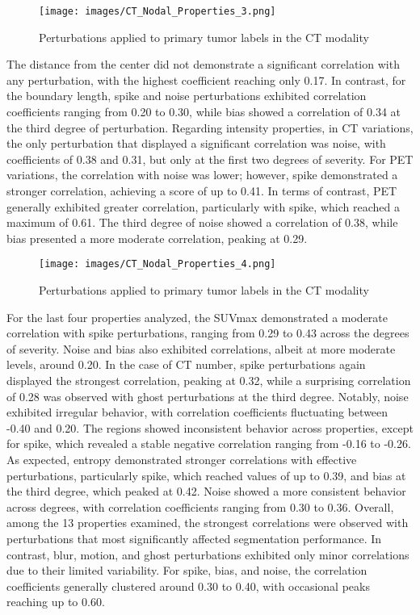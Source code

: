 \begin{figure}[ht]
    \centering
    \texttt{[image: images/CT\_Nodal\_Properties\_3.png]}
    \caption{Perturbations applied to primary tumor labels in the CT modality}
    \label{fig:three_subfigures}
\end{figure}
\newpage
The distance from the center did not demonstrate a significant correlation with any perturbation, with the highest coefficient reaching only 0.17. In contrast, for the boundary length, spike and noise perturbations exhibited correlation coefficients ranging from 0.20 to 0.30, while bias showed a correlation of 0.34 at the third degree of perturbation.
Regarding intensity properties, in CT variations, the only perturbation that displayed a significant correlation was noise, with coefficients of 0.38 and 0.31, but only at the first two degrees of severity. For PET variations, the correlation with noise was lower; however, spike demonstrated a stronger correlation, achieving a score of up to 0.41.
In terms of contrast, PET generally exhibited greater correlation, particularly with spike, which reached a maximum of 0.61. The third degree of noise showed a correlation of 0.38, while bias presented a more moderate correlation, peaking at 0.29.
\begin{figure}[ht]
    \centering
    \texttt{[image: images/CT\_Nodal\_Properties\_4.png]}
    \caption{Perturbations applied to primary tumor labels in the CT modality}
    \label{fig:three_subfigures}
\end{figure}

For the last four properties analyzed, the SUVmax demonstrated a moderate correlation with spike perturbations, ranging from 0.29 to 0.43 across the degrees of severity. Noise and bias also exhibited correlations, albeit at more moderate levels, around 0.20. In the case of CT number, spike perturbations again displayed the strongest correlation, peaking at 0.32, while a surprising correlation of 0.28 was observed with ghost perturbations at the third degree. Notably, noise exhibited irregular behavior, with correlation coefficients fluctuating between -0.40 and 0.20.
The regions showed inconsistent behavior across properties, except for spike, which revealed a stable negative correlation ranging from -0.16 to -0.26. As expected, entropy demonstrated stronger correlations with effective perturbations, particularly spike, which reached values of up to 0.39, and bias at the third degree, which peaked at 0.42. Noise showed a more consistent behavior across degrees, with correlation coefficients ranging from 0.30 to 0.36.
Overall, among the 13 properties examined, the strongest correlations were observed with perturbations that most significantly affected segmentation performance. In contrast, blur, motion, and ghost perturbations exhibited only minor correlations due to their limited variability. For spike, bias, and noise, the correlation coefficients generally clustered around 0.30 to 0.40, with occasional peaks reaching up to 0.60.

